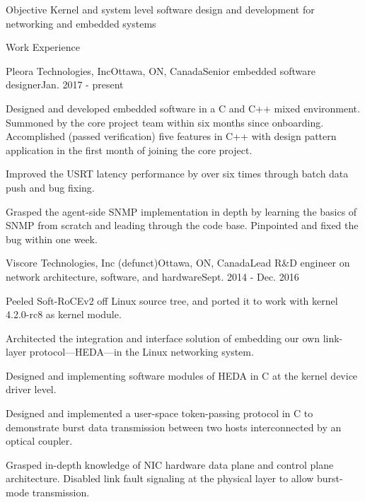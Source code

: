 \documentclass{resume} %
\begin{document}

\begin{rSection}{Objective}
Kernel and system level software design and development for networking and embedded systems
\end{rSection}


\begin{rSection}{Work Experience}

\begin{rSubsection}{Pleora Technologies, Inc}{Ottawa, ON, Canada}{Senior embedded software designer}{Jan. 2017 - present}
\item Designed and developed embedded software in a C and C++ mixed environment. Summoned by the core project team within six months since onboarding.
Accomplished (passed verification) five features in C++ with design pattern application in the first month of joining the core project.
\item Improved the USRT latency performance by over six times through batch data push and bug fixing.
\item Grasped the agent-side SNMP implementation in depth by learning the basics of SNMP from scratch and leading through the code base.
Pinpointed and fixed the bug within one week.
\end{rSubsection}


\begin{rSubsection}{Viscore Technologies, Inc (defunct)}{Ottawa, ON, Canada}{Lead R\&D engineer on network architecture, software, and hardware}{Sept. 2014 - Dec. 2016}
\item Peeled Soft-RoCEv2 off Linux source tree, and ported it to work with kernel 4.2.0-rc8 as kernel module.
\item Architected the integration and interface solution of embedding our own link-layer protocol---HEDA---in the Linux networking system.
\item Designed and implementing software modules of HEDA in C at the kernel device driver level.
\item Designed and implemented a user-space token-passing protocol in C to demonstrate burst data transmission between two hosts interconnected by an optical coupler.
\item Grasped in-depth knowledge of NIC hardware data plane and control plane architecture. Disabled link fault signaling at the physical layer to allow burst-mode transmission.
\end{rSubsection}


\end{rSection}
\end{document}
